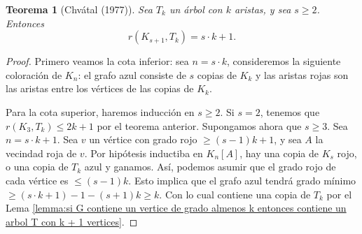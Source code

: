\documentclass[12pt]{report}
\theoremstyle{plain}
\newtheorem{theorem}{Teorema}[section]
\theoremstyle{definition}
\begin{document}
\begin{theorem}[Chvátal (1977)]
Sea $T_k$ un árbol con $k$ aristas, y sea $s \geq 2$. Entonces
\[
    r(K_{s+1}, T_k) = s \cdot k  + 1.
\]
\end{theorem}
\begin{proof}
Primero veamos la cota inferior: sea $n = s\cdot k$, consideremos la siguiente coloración de $K_n$: el grafo azul consiste de $s$ copias de $K_k$ y las aristas rojas son las aristas entre los vértices de las copias de $K_k$.


Para la cota superior, haremos inducción en $s \geq 2$. Si $s = 2$, tenemos que $r (K_3, T_k) \leq 2 k + 1$ por el teorema anterior. Supongamos ahora que $s \geq 3$. Sea $n = s\cdot k + 1$. Sea $v$ un vértice con grado rojo $\geq (s-1)k + 1$, y sea $A$ la vecindad roja de $v$. Por hipótesis inductiba en $K_n[A]$, hay una copia de $K_s$ rojo, o una copia de $T_k$ azul y ganamos. Así, podemos asumir que el grado rojo de cada vértice es $\leq (s-1)k$. Esto implica que el grafo azul tendrá grado mínimo $\geq (s \cdot k +1 ) - 1 - (s + 1) k \geq k$. Con lo cual contiene una copia de $T_k$ por el Lema \ref{lemma:si G contiene un vertice de grado almenos k entonces contiene un arbol T con k + 1 vertices}.
\end{proof}
\end{document}
